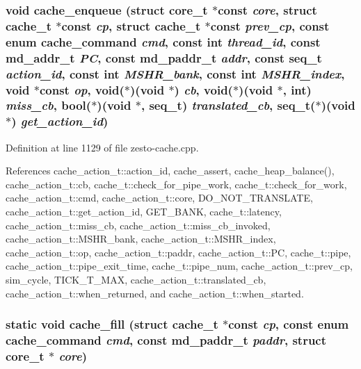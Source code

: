 \subsubsection[{cache\_\-enqueue}]{\setlength{\rightskip}{0pt plus 5cm}void cache\_\-enqueue (struct {\bf core\_\-t} $\ast$const  {\em core}, \/  struct {\bf cache\_\-t} $\ast$const  {\em cp}, \/  struct {\bf cache\_\-t} $\ast$const  {\em prev\_\-cp}, \/  const enum {\bf cache\_\-command} {\em cmd}, \/  const int {\em thread\_\-id}, \/  const {\bf md\_\-addr\_\-t} {\em PC}, \/  const {\bf md\_\-paddr\_\-t} {\em addr}, \/  const {\bf seq\_\-t} {\em action\_\-id}, \/  const int {\em MSHR\_\-bank}, \/  const int {\em MSHR\_\-index}, \/  void $\ast$const  {\em op}, \/  void($\ast$)(void $\ast$) {\em cb}, \/  void($\ast$)(void $\ast$, int) {\em miss\_\-cb}, \/  bool($\ast$)(void $\ast$, {\bf seq\_\-t}) {\em translated\_\-cb}, \/  {\bf seq\_\-t}($\ast$)(void $\ast$) {\em get\_\-action\_\-id})}\label{zesto-cache_8cpp_0831369c0f015a2e350b71f2fc445c70}




Definition at line 1129 of file zesto-cache.cpp.

References cache\_\-action\_\-t::action\_\-id, cache\_\-assert, cache\_\-heap\_\-balance(), cache\_\-action\_\-t::cb, cache\_\-t::check\_\-for\_\-pipe\_\-work, cache\_\-t::check\_\-for\_\-work, cache\_\-action\_\-t::cmd, cache\_\-action\_\-t::core, DO\_\-NOT\_\-TRANSLATE, cache\_\-action\_\-t::get\_\-action\_\-id, GET\_\-BANK, cache\_\-t::latency, cache\_\-action\_\-t::miss\_\-cb, cache\_\-action\_\-t::miss\_\-cb\_\-invoked, cache\_\-action\_\-t::MSHR\_\-bank, cache\_\-action\_\-t::MSHR\_\-index, cache\_\-action\_\-t::op, cache\_\-action\_\-t::paddr, cache\_\-action\_\-t::PC, cache\_\-t::pipe, cache\_\-action\_\-t::pipe\_\-exit\_\-time, cache\_\-t::pipe\_\-num, cache\_\-action\_\-t::prev\_\-cp, sim\_\-cycle, TICK\_\-T\_\-MAX, cache\_\-action\_\-t::translated\_\-cb, cache\_\-action\_\-t::when\_\-returned, and cache\_\-action\_\-t::when\_\-started.
\subsubsection[{cache\_\-fill}]{\setlength{\rightskip}{0pt plus 5cm}static void cache\_\-fill (struct {\bf cache\_\-t} $\ast$const  {\em cp}, \/  const enum {\bf cache\_\-command} {\em cmd}, \/  const {\bf md\_\-paddr\_\-t} {\em paddr}, \/  struct {\bf core\_\-t} $\ast$ {\em core})\hspace{0.3cm}{\tt  [inline, static]}}\label{zesto-cache_8cpp_4268c8076eb193fe97abe55263b81c9c}




